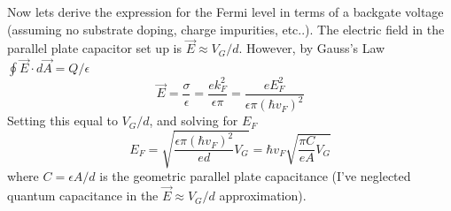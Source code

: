 \documentclass[a4paper,12pt]{article}
\begin{document}
Now lets derive the expression for the Fermi level in terms of a backgate voltage (assuming no substrate doping, charge impurities, etc..).  The electric field in the parallel plate capacitor set up is $\vec{E} \approx V_G/d$.  However, by Gauss's Law $\oint \vec{E} \cdot d\vec{A} = Q/\epsilon$
\begin{equation}
\vec{E}=\frac{\sigma}{\epsilon}=\frac{e k_F^2}{\epsilon \pi}=\frac{e E_F^2}{\epsilon \pi (\hbar v_F)^2}
\end{equation}
Setting this equal to $V_G/d$, and solving for $E_F$
\begin{equation}
E_F=\sqrt{\frac{\epsilon \pi (\hbar v_F)^2}{e d} V_G}=\hbar v_F \sqrt{\frac{\pi C}{eA} V_G}
\end{equation}
where $C=\epsilon A/d$ is the geometric parallel plate capacitance (I've neglected quantum capacitance in the $\vec{E} \approx V_G/d$ approximation).
\end{document}
